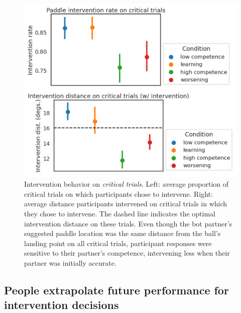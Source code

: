 \documentclass[10pt,letterpaper]{article}
\begin{document}
\begin{figure}[H]
\begin{center}
\includegraphics[width=\linewidth]{img/results-critical_trials.png}
\end{center}
\caption{Intervention behavior on \textit{critical trials}. Left: average proportion of critical trials on which participants chose to intervene. Right: average distance participants intervened on critical trials in which they chose to intervene. The dashed line indicates the optimal intervention distance on these trials. Even though the bot partner's suggested paddle location was the same distance from the ball's landing point on all critical trials, participant responses were sensitive to their partner's competence, intervening less when their partner was initially accurate.} 
\label{fig:critical_trials}
\end{figure}


\subsection{People extrapolate future performance for intervention decisions}
\end{document}
